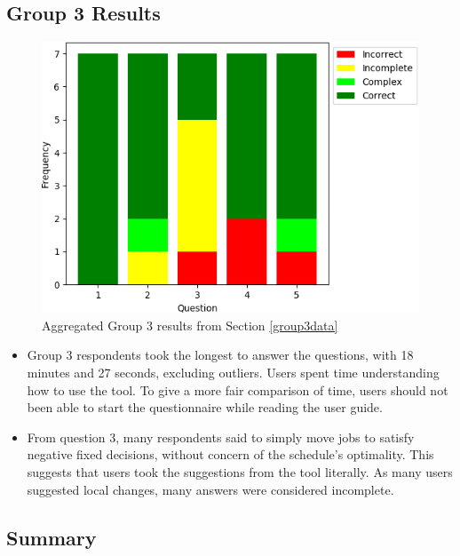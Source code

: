 \subsection{Group 3 Results}

\begin{figure}[H]
	\begin{center}
		\includegraphics[scale=0.55]{figures/questionnaire_results_group_three}
	\end{center}
	\caption{Aggregated Group 3 results from Section \ref{group3data}}
	\label{group3chart}
\end{figure}

\begin{itemize}
	\item Group 3 respondents took the longest to answer the questions, with 18 minutes and 27 seconds, excluding outliers. Users spent time understanding how to use the tool. To give a more fair comparison of time, users should not been able to start the questionnaire while reading the user guide.
	\item From question 3, many respondents said to simply move jobs to satisfy negative fixed decisions, without concern of the schedule's optimality. This suggests that users took the suggestions from the tool literally. As many users suggested local changes, many answers were considered incomplete.
\end{itemize}

\subsection{Summary}

